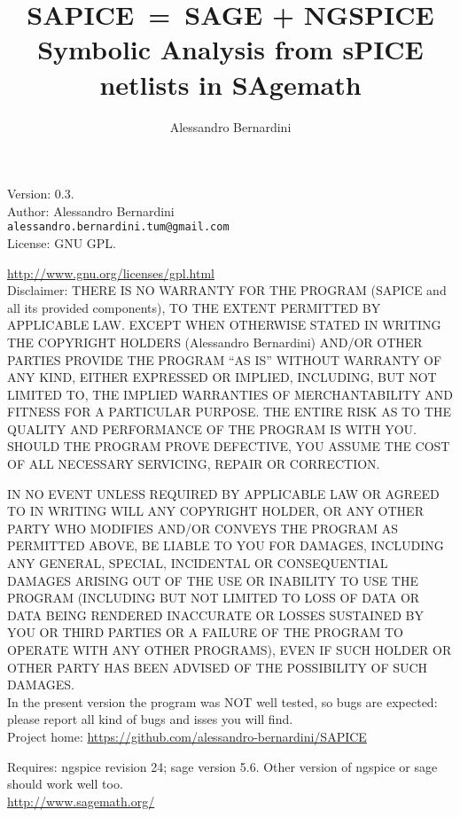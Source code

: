 \documentclass[a4paper]{article}
\title{SAPICE~=~SAGE + NGSPICE\\ {\normalsize Symbolic Analysis from sPICE netlists in SAgemath}}
\author{Alessandro Bernardini}
\begin{document}
\maketitle
Version: $0.3$.\\

Author: Alessandro Bernardini\\

{\tt alessandro.bernardini.tum@gmail.com}\\

License: GNU GPL.

\url{http://www.gnu.org/licenses/gpl.html} \\

Disclaimer: THERE IS NO WARRANTY FOR THE PROGRAM (SAPICE and all its provided components), TO THE EXTENT PERMITTED BY APPLICABLE LAW. EXCEPT WHEN OTHERWISE STATED IN WRITING THE COPYRIGHT HOLDERS (Alessandro Bernardini) AND/OR OTHER PARTIES PROVIDE THE PROGRAM “AS IS” WITHOUT WARRANTY OF ANY KIND, EITHER EXPRESSED OR IMPLIED, INCLUDING, BUT NOT LIMITED TO, THE IMPLIED WARRANTIES OF MERCHANTABILITY AND FITNESS FOR A PARTICULAR PURPOSE. THE ENTIRE RISK AS TO THE QUALITY AND PERFORMANCE OF THE PROGRAM IS WITH YOU. SHOULD THE PROGRAM PROVE DEFECTIVE, YOU ASSUME THE COST OF ALL NECESSARY SERVICING, REPAIR OR CORRECTION.

IN NO EVENT UNLESS REQUIRED BY APPLICABLE LAW OR AGREED TO IN WRITING WILL ANY COPYRIGHT HOLDER, OR ANY OTHER PARTY WHO MODIFIES AND/OR CONVEYS THE PROGRAM AS PERMITTED ABOVE, BE LIABLE TO YOU FOR DAMAGES, INCLUDING ANY GENERAL, SPECIAL, INCIDENTAL OR CONSEQUENTIAL DAMAGES ARISING OUT OF THE USE OR INABILITY TO USE THE PROGRAM (INCLUDING BUT NOT LIMITED TO LOSS OF DATA OR DATA BEING RENDERED INACCURATE OR LOSSES SUSTAINED BY YOU OR THIRD PARTIES OR A FAILURE OF THE PROGRAM TO OPERATE WITH ANY OTHER PROGRAMS), EVEN IF SUCH HOLDER OR OTHER PARTY HAS BEEN ADVISED OF THE POSSIBILITY OF SUCH DAMAGES.\\ 

In the present version the program was NOT well tested, so bugs are expected: please report all kind of bugs and isses you will find.\\

Project home:
\url{https://github.com/alessandro-bernardini/SAPICE}

Requires: ngspice revision 24; sage version 5.6. Other version of ngspice or sage should work well too.\\

\url{http://www.sagemath.org/}
\end{document}

